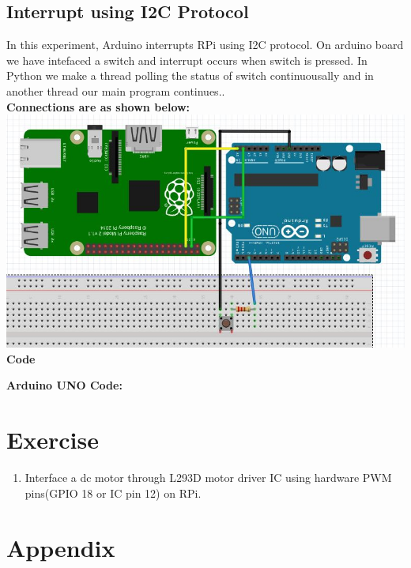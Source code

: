 \documentclass[11pt,a4paper]{article}
\begin{document}
	\subsection{Interrupt using I2C Protocol} 
	In this experiment, Arduino interrupts RPi using I2C protocol. On arduino board we have intefaced a switch and interrupt occurs when switch is pressed. In Python we make a thread polling the status of switch continuousally and in another thread our main program continues.. \\
	\vspace{5mm}
	\textbf{Connections are as shown below:}\\
	\vspace{5mm}
	\centering
	\includegraphics[scale=0.5]{rpi_with_arduino.jpg}
	\flushleft
	\vspace{5mm}	
	\textbf{Code}
	\vspace{5mm}
	
	\vspace{5mm}
	\textbf{Arduino UNO Code:}
	\vspace{5mm}
	
	\section{Exercise}
	\begin{enumerate}
			\item Interface a dc motor through L293D motor driver IC using hardware PWM pins(GPIO 18 or IC pin 12) on RPi.
	\end{enumerate}
	
	\section{Appendix}
\end{document}
